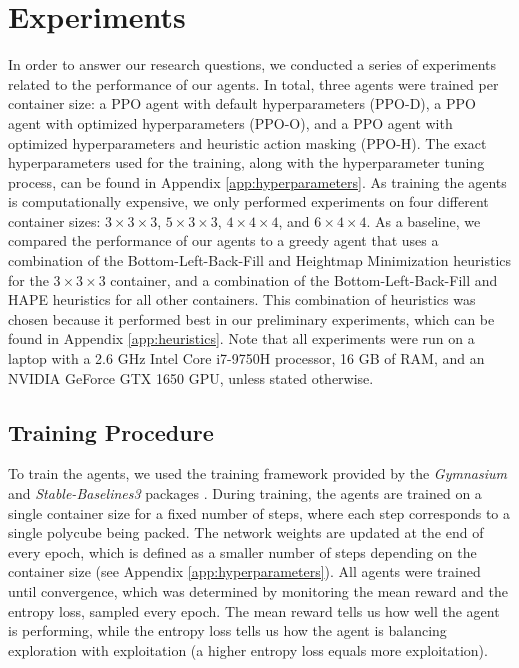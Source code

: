 \documentclass[conference]{IEEEtran}
\begin{document}
\section{Experiments} \label{sec:experiments}
In order to answer our research questions, we conducted a series of experiments related to the performance of our agents.
In total, three agents were trained per container size: a PPO agent with default hyperparameters (PPO-D), a PPO agent with optimized hyperparameters (PPO-O), and a PPO agent with optimized hyperparameters and heuristic action masking (PPO-H).
The exact hyperparameters used for the training, along with the hyperparameter tuning process, can be found in Appendix \ref{app:hyperparameters}.
As training the agents is computationally expensive, we only performed experiments on four different container sizes: $3 \times 3 \times 3$, $5 \times 3 \times 3$, $4 \times 4 \times 4$, and $6 \times 4 \times 4$.
As a baseline, we compared the performance of our agents to a greedy agent that uses a combination of the Bottom-Left-Back-Fill and Heightmap Minimization heuristics for the $3 \times 3 \times 3$ container, and a combination of the Bottom-Left-Back-Fill and HAPE heuristics for all other containers.
This combination of heuristics was chosen because it performed best in our preliminary experiments, which can be found in Appendix \ref{app:heuristics}.
Note that all experiments were run on a laptop with a 2.6 GHz Intel Core i7-9750H processor, 16 GB of RAM, and an NVIDIA GeForce GTX 1650 GPU, unless stated otherwise.

\subsection{Training Procedure}
To train the agents, we used the training framework provided by the \textit{Gymnasium} and \textit{Stable-Baselines3} packages \cite{gymnasium} \cite{stable-baselines3}.
During training, the agents are trained on a single container size for a fixed number of steps, where each step corresponds to a single polycube being packed.
The network weights are updated at the end of every epoch, which is defined as a smaller number of steps depending on the container size (see Appendix \ref{app:hyperparameters}).
All agents were trained until convergence, which was determined by monitoring the mean reward and the entropy loss, sampled every epoch.
The mean reward tells us how well the agent is performing, while the entropy loss tells us how the agent is balancing exploration with exploitation (a higher entropy loss equals more exploitation).
\end{document}
